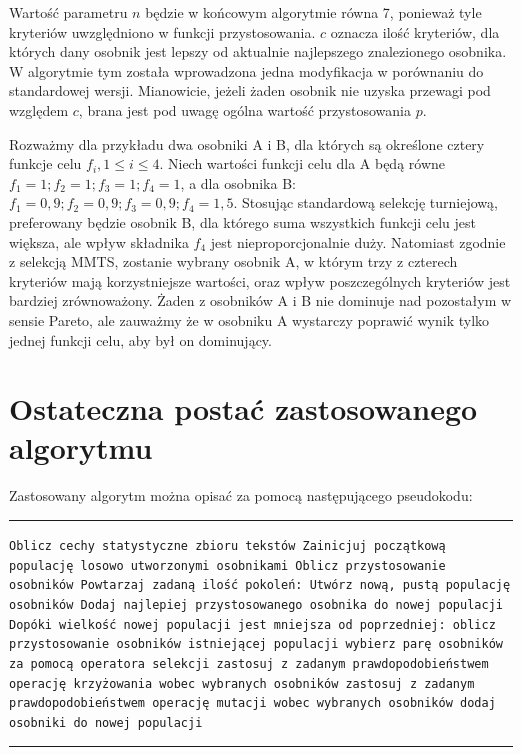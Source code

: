 \documentclass{xmgr}
\begin{document}
Wartość parametru $n$ będzie w końcowym algorytmie równa 7, ponieważ tyle kryteriów uwzględniono w funkcji przystosowania. $c$ oznacza ilość kryteriów, dla których dany osobnik jest lepszy od aktualnie najlepszego znalezionego osobnika. W algorytmie tym została wprowadzona jedna modyfikacja w porównaniu do standardowej wersji. Mianowicie, jeżeli żaden osobnik nie uzyska przewagi pod względem $c$, brana jest pod uwagę ogólna wartość przystosowania $p$.

Rozważmy dla przykładu dwa osobniki A i B, dla których są określone cztery funkcje celu $f_i, 1 \le i \le 4$. Niech wartości funkcji celu dla A będą równe $f_1 = 1; f_2 = 1; f_3 = 1; f_4 = 1$, a dla osobnika B: $f_1 = 0,9; f_2 = 0,9; f_3 = 0,9; f_4 = 1,5$. Stosując standardową selekcję turniejową, preferowany będzie osobnik B, dla którego suma wszystkich funkcji celu jest większa, ale wpływ składnika $f_4$ jest nieproporcjonalnie duży. Natomiast zgodnie z selekcją MMTS, zostanie wybrany osobnik A, w którym trzy z czterech kryteriów mają korzystniejsze wartości, oraz wpływ poszczególnych kryteriów jest bardziej zrównoważony. Żaden z osobników A i B nie dominuje nad pozostałym w sensie Pareto, ale zauważmy że w osobniku A wystarczy poprawić wynik tylko jednej funkcji celu, aby był on dominujący.


\section{Ostateczna postać zastosowanego algorytmu}

Zastosowany algorytm można opisać za pomocą następującego pseudokodu:

\noindent
\rule{380pt}{0.5pt}\newline
\texttt{Oblicz cechy statystyczne zbioru tekstów\newline
Zainicjuj początkową populację losowo utworzonymi osobnikami\newline
Oblicz przystosowanie osobników\newline
Powtarzaj zadaną ilość pokoleń:\newline
\indent Utwórz nową, pustą populację osobników\newline
\indent Dodaj najlepiej przystosowanego osobnika do nowej populacji\newline
\indent Dopóki wielkość nowej populacji jest mniejsza od poprzedniej:\newline
\indent\indent oblicz przystosowanie osobników istniejącej populacji\newline
\indent\indent wybierz parę osobników za pomocą operatora selekcji\newline
\indent\indent zastosuj z zadanym prawdopodobieństwem operację krzyżowania\newline
\indent\indent wobec wybranych osobników\newline
\indent\indent zastosuj z zadanym prawdopodobieństwem operację mutacji\newline
\indent\indent wobec wybranych osobników\newline
\indent\indent dodaj osobniki do nowej populacji\newline
}
\rule{380pt}{0.5pt}\newline
\end{document}
